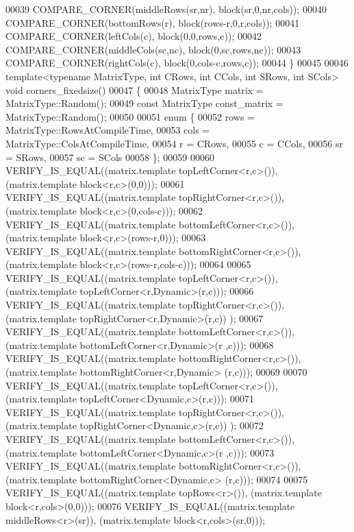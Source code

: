 \begin{DoxyCode}
00039   COMPARE\_CORNER(middleRows(sr,nr), block(sr,0,nr,cols));
00040   COMPARE\_CORNER(bottomRows(r), block(rows-r,0,r,cols));
00041   COMPARE\_CORNER(leftCols(c), block(0,0,rows,c));
00042   COMPARE\_CORNER(middleCols(sc,nc), block(0,sc,rows,nc));
00043   COMPARE\_CORNER(rightCols(c), block(0,cols-c,rows,c));
00044 \}
00045 
00046 \textcolor{keyword}{template}<\textcolor{keyword}{typename} MatrixType, \textcolor{keywordtype}{int} CRows, \textcolor{keywordtype}{int} CCols, \textcolor{keywordtype}{int} SRows, \textcolor{keywordtype}{int} SCols> \textcolor{keywordtype}{void} corners\_fixedsize()
00047 \{
00048   MatrixType matrix = MatrixType::Random();
00049   \textcolor{keyword}{const} MatrixType const\_matrix = MatrixType::Random();
00050 
00051   \textcolor{keyword}{enum} \{
00052     rows = MatrixType::RowsAtCompileTime,
00053     cols = MatrixType::ColsAtCompileTime,
00054     r = CRows,
00055     c = CCols,
00056     sr = SRows,
00057     sc = SCols
00058   \};
00059 
00060   VERIFY\_IS\_EQUAL((matrix.template topLeftCorner<r,c>()), (matrix.template block<r,c>(0,0)));
00061   VERIFY\_IS\_EQUAL((matrix.template topRightCorner<r,c>()), (matrix.template block<r,c>(0,cols-c)));
00062   VERIFY\_IS\_EQUAL((matrix.template bottomLeftCorner<r,c>()), (matrix.template block<r,c>(rows-r,0)));
00063   VERIFY\_IS\_EQUAL((matrix.template bottomRightCorner<r,c>()), (matrix.template block<r,c>(rows-r,cols-c)));
00064 
00065   VERIFY\_IS\_EQUAL((matrix.template topLeftCorner<r,c>()), (matrix.template topLeftCorner<r,Dynamic>(r,c)));
00066   VERIFY\_IS\_EQUAL((matrix.template topRightCorner<r,c>()), (matrix.template topRightCorner<r,Dynamic>(r,c))
      );
00067   VERIFY\_IS\_EQUAL((matrix.template bottomLeftCorner<r,c>()), (matrix.template bottomLeftCorner<r,Dynamic>(r
      ,c)));
00068   VERIFY\_IS\_EQUAL((matrix.template bottomRightCorner<r,c>()), (matrix.template bottomRightCorner<r,Dynamic>
      (r,c)));
00069 
00070   VERIFY\_IS\_EQUAL((matrix.template topLeftCorner<r,c>()), (matrix.template topLeftCorner<Dynamic,c>(r,c)));
00071   VERIFY\_IS\_EQUAL((matrix.template topRightCorner<r,c>()), (matrix.template topRightCorner<Dynamic,c>(r,c))
      );
00072   VERIFY\_IS\_EQUAL((matrix.template bottomLeftCorner<r,c>()), (matrix.template bottomLeftCorner<Dynamic,c>(r
      ,c)));
00073   VERIFY\_IS\_EQUAL((matrix.template bottomRightCorner<r,c>()), (matrix.template bottomRightCorner<Dynamic,c>
      (r,c)));
00074 
00075   VERIFY\_IS\_EQUAL((matrix.template topRows<r>()), (matrix.template block<r,cols>(0,0)));
00076   VERIFY\_IS\_EQUAL((matrix.template middleRows<r>(sr)), (matrix.template block<r,cols>(sr,0)));

\end{DoxyCode}
